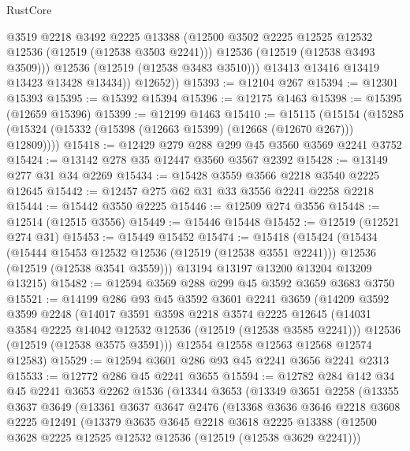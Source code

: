 \begin{lexlean}{RustCore}
\begin{coremodule}
                @3519
                @2218
                @3492
                @2225
                @13388
                (@12500 @3502 @2225 @12525 @12532 @12536 (@12519 (@12538 @3503 @2241)))
                @12536
                (@12519 (@12538 @3493 @3509)))
              @12536
              (@12519 (@12538 @3483 @3510)))
            @13413
            @13416
            @13419
            @13423
            @13428
            @13434))
        @12652))
@15393 := @12104 @267
@15394 := @12301 @15393
@15395 := @15392 @15394
@15396 := @12175 @1463
@15398 := @15395 (@12659 @15396)
@15399 := @12199 @1463
@15410 := @15115
    (@15154 (@15285 (@15324 (@15332 (@15398 (@12663 @15399) (@12668 (@12670 @267))) @12809))))
@15418 := @12429 @279 @288 @299 @45 @3560 @3569 @2241 @3752
@15424 := @13142 @278 @35 @12447 @3560 @3567 @2392
@15428 := @13149 @277 @31 @34 @2269
@15434 := @15428 @3559 @3566 @2218 @3540 @2225 @12645
@15442 := @12457 @275 @62 @31 @33 @3556 @2241 @2258 @2218
@15444 := @15442 @3550 @2225
@15446 := @12509 @274 @3556
@15448 := @12514 (@12515 @3556)
@15449 := @15446 @15448
@15452 := @12519 (@12521 @274 @31)
@15453 := @15449 @15452
@15474 := @15418
    (@15424
      (@15434
        (@15444 @15453 @12532 @12536 (@12519 (@12538 @3551 @2241)))
        @12536
        (@12519 (@12538 @3541 @3559)))
      @13194
      @13197
      @13200
      @13204
      @13209
      @13215)
@15482 := @12594 @3569 @288 @299 @45 @3592 @3659 @3683 @3750
@15521 := @14199
    @286
    @93
    @45
    @3592
    @3601
    @2241
    @3659
    (@14209
      @3592
      @3599
      @2248
      (@14017
        @3591
        @3598
        @2218
        @3574
        @2225
        @12645
        (@14031 @3584 @2225 @14042 @12532 @12536 (@12519 (@12538 @3585 @2241)))
        @12536
        (@12519 (@12538 @3575 @3591)))
      @12554
      @12558
      @12563
      @12568
      @12574
      @12583)
@15529 := @12594 @3601 @286 @93 @45 @2241 @3656 @2241 @2313
@15533 := @12772 @286 @45 @2241 @3655
@15594 := @12782
    @284
    @142
    @34
    @45
    @2241
    @3653
    @2262
    @1536
    (@13344
      @3653
      (@13349
        @3651
        @2258
        (@13355
          @3637
          @3649
          (@13361
            @3637
            @3647
            @2476
            (@13368
              @3636
              @3646
              @2218
              @3608
              @2225
              @12491
              (@13379
                @3635
                @3645
                @2218
                @3618
                @2225
                @13388
                (@12500 @3628 @2225 @12525 @12532 @12536 (@12519 (@12538 @3629 @2241)))

\end{coremodule}
\end{lexlean}
